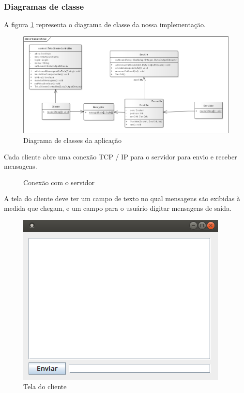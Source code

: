 \documentclass[a4paper,12pt]{article}
\begin{document}
\subsubsection{Diagramas de classe}
A figura \ref{fig2} representa o diagrama de classe da nossa implementação.
\begin{figure}[H]
\includegraphics[scale=0.4]{img/class.png}    
\caption{Diagrama de classes da aplicação}
\centering
\label{fig2}
\end{figure} 
Cada cliente abre uma conexão TCP / IP para o servidor para envio e receber mensagens.
\begin{figure}[H]
	
	\caption{Conexão com o servidor}
\end{figure}
A tela do cliente deve ter um campo de texto no qual mensagens são exibidas à medida que chegam, e um campo para o usuário digitar mensagens de saída.
\begin{figure}[H]
	\centering
	\includegraphics[scale=0.6]{img/telacliente.png}    
	\caption{Tela do cliente}
	\label{fig11}     
\end{figure} 
\end{document}
